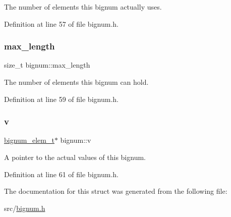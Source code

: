 The number of elements this bignum actually uses. 

Definition at line 57 of file bignum.\+h.

\mbox{\label{structbignum_aca95f5f27d2bb952cb8a6f906a138e62}} 
\subsubsection{\texorpdfstring{max\+\_\+length}{max\_length}}
{\footnotesize\ttfamily size\+\_\+t bignum\+::max\+\_\+length}

The number of elements this bignum can hold. 

Definition at line 59 of file bignum.\+h.

\mbox{\label{structbignum_a60955e5f7046ec12c4c292510ad18146}} 
\subsubsection{\texorpdfstring{v}{v}}
{\footnotesize\ttfamily \hyperlink{bignum_8h_a8a2940600ccf96356e2a21b453d3bd92}{bignum\+\_\+elem\+\_\+t}$\ast$ bignum\+::v}

A pointer to the actual values of this bignum. 

Definition at line 61 of file bignum.\+h.



The documentation for this struct was generated from the following file\+:\begin{DoxyCompactItemize}
\item 
src/\hyperlink{bignum_8h}{bignum.\+h}\end{DoxyCompactItemize}
